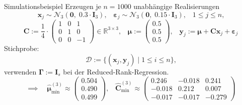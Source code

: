 \documentclass[12pt, aspectratio=169]{beamer}
\newcommand{\R}{\mathbb{R}}
\newcommand{\muu}{\bm{\mu}}
\newcommand{\C}{\mathbf{C}}
\newcommand{\Ggamma}{\bm{\Gamma}}
\newcommand{\xx}{\mathbf{x}}
\newcommand{\yy}{\mathbf{y}}
\begin{document}
\begin{frame}{Simulationsbeispiel}
	Erzeugen je $n=1000$ unabhängige Realisierungen 
	$$\xx_j \sim \mathcal{N}_3(\mathbf{0}, \; 0.3 \cdot \mathbf{I}_3)\text{,} \quad \bm{\varepsilon}_j \sim \mathcal{N}_3(\mathbf{0}, \; 0.15 \cdot \mathbf{I}_3)\text{,}\quad 1 \leq j \leq n \text{,}$$
	$$\C := \frac{1}{4} \cdot \begin{pmatrix}
	1 & 0 & 1 \\
	0 & 1 & 0 \\
	0 & 0 & -1
	\end{pmatrix} \in \R^{3 \times 3} \text{,} \quad \muu := \begin{pmatrix}
	0.5 \\
	0.5 \\
	0.5
	\end{pmatrix} \text{,} \quad \yy_j := \muu + \C \xx_j + \bm{\varepsilon}_j$$
	Stichprobe:
	\[\mathcal{D} := \{(\xx_j, \yy_j) \;|\; 1 \leq i \leq n\}\text{,}\]
	verwenden $\Ggamma := \mathbf{I}_s$ bei der Reduced-Rank-Regression.
	$$ \implies \quad \widehat{\muu}_{\min}^{(3)} \approx \begin{pmatrix}
	0.504 \\
	 0.490 \\
	  0.499
	\end{pmatrix} \text{,} \quad \widehat{\C}_{\min}^{(3)} \approx \begin{pmatrix}
	0.246 & -0.018 & 0.241 \\
	-0.018 & 0.212 & 0.007 \\
	-0.017 & -0.017 & -0.279
	\end{pmatrix}$$
\end{frame}
\end{document}
